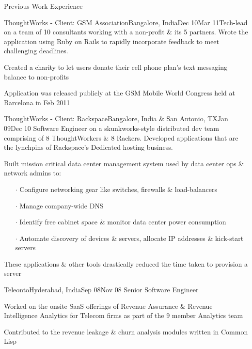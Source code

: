 \documentclass{resume} %
\begin{document}
\begin{rSection}{Previous Work Experience}

\begin{rSubsection}{ThoughtWorks - Client: GSM Association}{Bangalore, India}{Dec 10}{Mar 11}{Tech-lead on a team of 10 consultants working with a non-profit
  \& its 5 partners. Wrote the application using Ruby on Rails to
  rapidly incorporate feedback to meet challenging deadlines.}
\item Created a charity to let users donate their cell phone plan's text messaging
  balance to non-profits
\item Application was released publicly at the GSM Mobile World Congress held at Barcelona in Feb 2011
\end{rSubsection}



\begin{rSubsection}{ThoughtWorks - Client: Rackspace}{Bangalore, India \& San Antonio,
  TX}{Jan 09}{Dec
    10}
{Software Engineer on a skunkworks-style distributed dev team comprising of 8
  ThoughtWorkers \& 8 Rackers. Developed applications that are the
  lynchpins of Rackspace's Dedicated hosting business.}

\item Built mission critical data center management system used by
  data center ops \& network admins to:
\vspace{-0.5em}
\begin{itemize}  \itemsep0.5pt \parskip0pt
    \item[$\cdot$] Configure networking gear like switches, firewalls \& load-balancers
    \item[$\cdot$] Manage company-wide DNS
    \item[$\cdot$] Identify free cabinet space \& monitor data center power consumption
    \item[$\cdot$] Automate discovery of devices \& servers, allocate IP addresses \& kick-start servers
\end{itemize}
\item These applications \& other tools drastically reduced the time taken to provision a server
\end{rSubsection}


\begin{rSubsection}{Teleonto}{Hyderabad, India}{Sep 08}{Nov 08}
{Senior Software Engineer}
\item Worked on the onsite SaaS offerings of Revenue Assurance \& Revenue Intelligence Analytics for Telecom firms as part of the 9 member Analytics team
\item Contributed to the revenue leakage \& churn analysis modules written in Common Lisp
\end{rSubsection}


\end{rSection}
\end{document}
